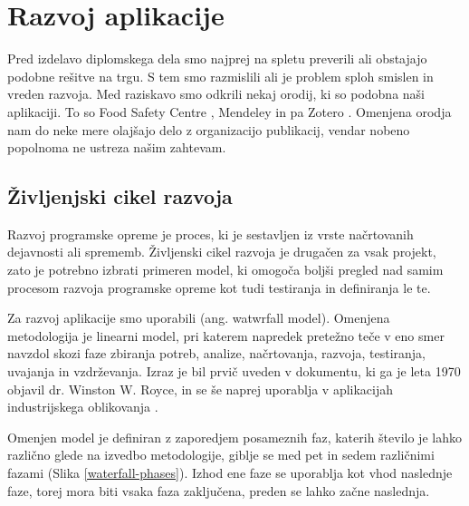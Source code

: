 \documentclass[a4paper, 12pt]{book}
\begin{document}


\chapter{Razvoj aplikacije}
\label{pregled-podrocja-chapter}

Pred izdelavo diplomskega dela smo najprej na spletu preverili ali obstajajo podobne rešitve na trgu. S tem smo razmislili ali je problem sploh smislen in vreden razvoja. Med raziskavo smo odkrili nekaj orodij, ki so podobna naši aplikaciji. To so Food Safety Centre \cite{food-safety-centre}, Mendeley \cite{mendeley-manager} in pa Zotero \cite{zotero-manager}. Omenjena orodja nam do neke mere olajšajo delo z organizacijo publikacij, vendar nobeno popolnoma ne ustreza našim zahtevam. 


\section{Življenjski cikel razvoja }
Razvoj programske opreme je proces, ki je sestavljen iz vrste načrtovanih dejavnosti ali sprememb. Življenski cikel razvoja je drugačen za vsak projekt, zato je potrebno izbrati primeren model, ki omogoča boljši pregled nad samim procesom razvoja programske opreme kot tudi testiranja in definiranja le te.

Za razvoj aplikacije smo uporabili  (ang. watwrfall model). Omenjena metodologija je linearni model, pri katerem napredek pretežno teče v eno smer navzdol skozi faze zbiranja potreb, analize, načrtovanja, razvoja, testiranja, uvajanja in vzdrževanja. Izraz je bil prvič uveden v dokumentu, ki ga je leta 1970 objavil dr. Winston W. Royce, in se še naprej uporablja v aplikacijah industrijskega oblikovanja \cite{waterfall-model}.

Omenjen model je definiran z zaporedjem posameznih faz, katerih število je lahko različno glede na izvedbo metodologije, giblje se med pet in sedem različnimi fazami (Slika \ref{waterfall-phases}). Izhod ene faze se uporablja kot vhod naslednje faze, torej mora biti vsaka faza zaključena, preden se lahko začne naslednja.
\end{document}
